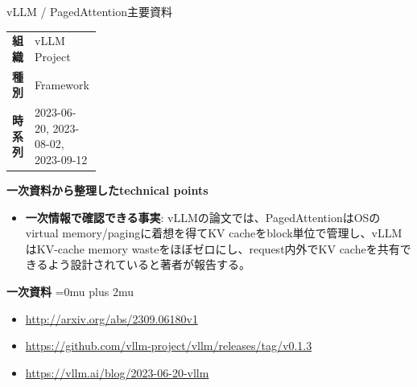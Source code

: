 \begin{technicalnote}{vLLM / PagedAttention}{主要資料}
\begingroup
\begin{tabularx}{\linewidth}{@{}>{\bfseries}p{0.22\linewidth}X@{}}
組織 & vLLM Project \\
種別 & Framework \\
時系列 & 2023-06-20, 2023-08-02, 2023-09-12 \\
\end{tabularx}
\smallskip
{\bfseries 一次資料から整理したtechnical points}
\begin{itemize}[leftmargin=1.5em,itemsep=0.35em]
\item \textbf{一次情報で確認できる事実}: vLLMの論文では、PagedAttentionはOSのvirtual memory/pagingに着想を得てKV cacheをblock単位で管理し、vLLMはKV-cache memory wasteをほぼゼロにし、request内外でKV cacheを共有できるよう設計されていると著者が報告する。
\end{itemize}
\begin{minipage}{\linewidth}
\begin{samepage}
{\bfseries 一次資料}
\begingroup\sloppy
\Urlmuskip=0mu plus 2mu\relax
\begin{itemize}[leftmargin=1.5em,itemsep=0.25em]
\item {\scriptsize\url{http://arxiv.org/abs/2309.06180v1}}
\item {\scriptsize\url{https://github.com/vllm-project/vllm/releases/tag/v0.1.3}}
\item {\scriptsize\url{https://vllm.ai/blog/2023-06-20-vllm}}
\end{itemize}
\endgroup
\end{samepage}
\end{minipage}
\endgroup
\end{technicalnote}
\medskip

